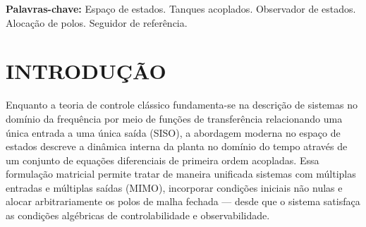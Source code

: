\documentclass[a4paper,12pt]{article}
\begin{document}
\vspace{\baselineskip}

\noindent\textbf{Palavras-chave:} Espaço de estados. Tanques acoplados. Observador de estados. Alocação de polos. Seguidor de referência.

\newpage


\thispagestyle{empty}

\begin{center}
\listoffigures
\end{center}

\newpage


\thispagestyle{empty}

\begin{center}
\tableofcontents
\end{center}

\newpage


\thispagestyle{main}

\section{INTRODUÇÃO}

\begin{justify}
    \hspace{4ex}Enquanto a teoria de controle clássico fundamenta-se na descrição de sistemas no domínio da frequência por meio de funções de transferência relacionando uma única entrada a uma única saída (SISO), a abordagem moderna no espaço de estados descreve a dinâmica interna da planta no domínio do tempo através de um conjunto de equações diferenciais de primeira ordem acopladas. Essa formulação matricial permite tratar de maneira unificada sistemas com múltiplas entradas e múltiplas saídas (MIMO), incorporar condições iniciais não nulas e alocar arbitrariamente os polos de malha fechada — desde que o sistema satisfaça as condições algébricas de controlabilidade e observabilidade.
\end{justify}
\end{document}
